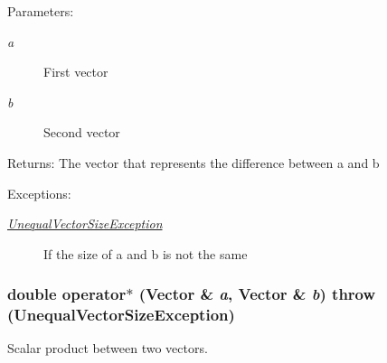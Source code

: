 \begin{Desc}
\item[Parameters:]
\begin{description}
\item[{\em a}]First vector \item[{\em b}]Second vector \end{description}
\end{Desc}
\begin{Desc}
\item[Returns:]The vector that represents the difference between a and b \end{Desc}
\begin{Desc}
\item[Exceptions:]
\begin{description}
\item[{\em \hyperlink{classgrassmann_1_1UnequalVectorSizeException}{UnequalVectorSizeException}}]If the size of a and b is not the same \end{description}
\end{Desc}
\hypertarget{classgrassmann_1_1Vector_cd40ad4e72bc86ac3fbf725cf8184d2d}{
\subsubsection[operator$\ast$]{\setlength{\rightskip}{0pt plus 5cm}double operator$\ast$ ({\bf Vector} \& {\em a}, \/  {\bf Vector} \& {\em b})  throw ({\bf UnequalVectorSizeException})}}
\label{classgrassmann_1_1Vector_cd40ad4e72bc86ac3fbf725cf8184d2d}


Scalar product between two vectors. 

